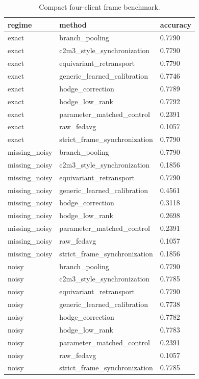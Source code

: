 \begin{table}[t]
\centering
\caption{Compact four-client frame benchmark.}
\begin{tabular}{lll}
\toprule
regime & method & accuracy \\
\midrule
exact & branch\_pooling & 0.7790 \\
exact & c2m3\_style\_synchronization & 0.7790 \\
exact & equivariant\_retransport & 0.7790 \\
exact & generic\_learned\_calibration & 0.7746 \\
exact & hodge\_correction & 0.7789 \\
exact & hodge\_low\_rank & 0.7792 \\
exact & parameter\_matched\_control & 0.2391 \\
exact & raw\_fedavg & 0.1057 \\
exact & strict\_frame\_synchronization & 0.7790 \\
missing\_noisy & branch\_pooling & 0.7790 \\
missing\_noisy & c2m3\_style\_synchronization & 0.1856 \\
missing\_noisy & equivariant\_retransport & 0.7790 \\
missing\_noisy & generic\_learned\_calibration & 0.4561 \\
missing\_noisy & hodge\_correction & 0.3118 \\
missing\_noisy & hodge\_low\_rank & 0.2698 \\
missing\_noisy & parameter\_matched\_control & 0.2391 \\
missing\_noisy & raw\_fedavg & 0.1057 \\
missing\_noisy & strict\_frame\_synchronization & 0.1856 \\
noisy & branch\_pooling & 0.7790 \\
noisy & c2m3\_style\_synchronization & 0.7785 \\
noisy & equivariant\_retransport & 0.7790 \\
noisy & generic\_learned\_calibration & 0.7738 \\
noisy & hodge\_correction & 0.7782 \\
noisy & hodge\_low\_rank & 0.7783 \\
noisy & parameter\_matched\_control & 0.2391 \\
noisy & raw\_fedavg & 0.1057 \\
noisy & strict\_frame\_synchronization & 0.7785 \\
\bottomrule
\end{tabular}
\end{table}
